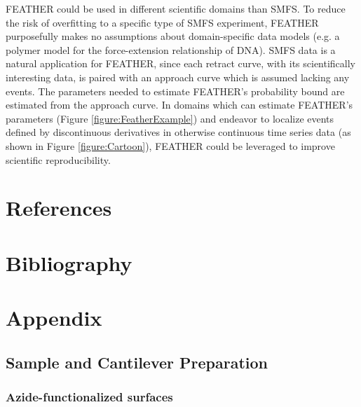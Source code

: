\documentclass[%
  aip,12pt,tightenlines,
  amsthm,
 amsmath,amssymb
]{article}
\newcommand{\fRef}[1]{Figure \ref{figure:#1}}
\newcommand{\sLabel}[1]{\label{section:#1}}
\newcommand{\name}[0]{FEATHER}
\newcommand{\singlemol}[0]{SMFS}
\begin{document}
\name{} could be used in different scientific domains than \singlemol{}. To reduce the risk of overfitting to a specific type of \singlemol{} experiment, \name{} purposefully makes no assumptions about domain-specific data models (e.g. a polymer model for the force-extension relationship of DNA). \singlemol{} data is a natural application for \name{}, since each retract curve, with its scientifically interesting data, is paired with an approach curve which is assumed lacking any events. The parameters needed to estimate \name{}'s probability bound are estimated from the approach curve. In domains which can estimate \name{}'s parameters (\fRef{FeatherExample}) and endeavor to localize events defined by discontinuous derivatives in otherwise continuous time series data (as shown in \fRef{Cartoon}), \name{} could be leveraged to improve scientific reproducibility.

\clearpage

\section{References}



\clearpage

\section{Bibliography}




\clearpage

\section{Appendix}

\renewcommand{\thepage}{S\arabic{page}} 
\renewcommand{\thesection}{S\arabic{section}}  
\renewcommand{\thetable}{S\arabic{table}}  
\renewcommand{\thefigure}{S\arabic{figure}} 
\setcounter{figure}{0}
\setcounter{table}{0}


\subsection{\sLabel{SampleDetails}Sample and Cantilever Preparation}



\subsubsection{\sLabel{Surface}Azide-functionalized surfaces}
\end{document}
